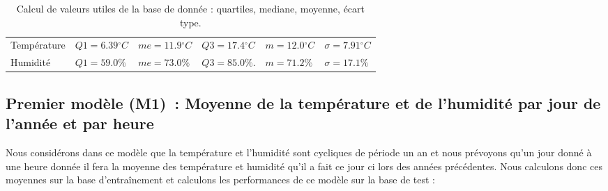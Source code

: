 \documentclass[11pt,a4paper]{article}
\begin{document}
 
\begin{table}[ht]
\begin{center}
\begin{tabular}{llllll}\hline\hline
Température& $Q1 = 6.39{}^{\circ}C$ &$ me = 11.9 {}^{\circ}C$ & $Q3 = 17.4{}^{\circ}C $&$ m= 12.0{}^{\circ}C $ & $\sigma = 7.91 {}^{\circ}C$ \\
Humidité    &   $ Q1 = 59.0\%$           &$  me = 73.0\%  $           & $Q3 = 85.0\%.           $& $ m=71.2\%  $ & $\sigma = 17.1 \% $ \\
\hline 
\end{tabular}
\caption{Calcul de valeurs utiles de la base de donnée : quartiles, mediane, moyenne, écart type.}\label{tab:qmme}
\end{center}
\end{table}



\subsection{Premier modèle (M1)~: Moyenne de la température et de l'humidité par jour de l'année et par heure }
Nous considérons dans ce modèle que la température et l'humidité sont cycliques de période un an et nous prévoyons qu'un jour donné à une heure donnée il fera la moyenne des température et humidité qu'il a fait ce jour ci lors des années précédentes.
Nous calculons donc ces moyennes sur la base d'entraînement et calculons les performances de ce modèle sur la base de test : \\
\end{document}

